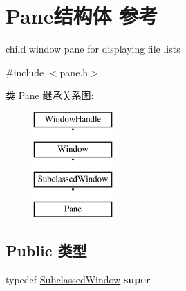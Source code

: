 \hypertarget{struct_pane}{}\section{Pane结构体 参考}
\label{struct_pane}


child window pane for displaying file lists  




{\ttfamily \#include $<$pane.\+h$>$}

类 Pane 继承关系图\+:\begin{figure}[H]
\begin{center}
\leavevmode
\includegraphics[height=4.000000cm]{struct_pane}
\end{center}
\end{figure}
\subsection*{Public 类型}
\begin{DoxyCompactItemize}
\item 
\mbox{\label{struct_pane_a6bdcd054f5dafad03295cf436b4fae40}} 
typedef \hyperlink{struct_subclassed_window}{Subclassed\+Window} {\bfseries super}
\end{DoxyCompactItemize}
